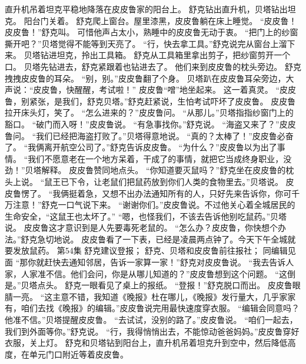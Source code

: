 \documentclass[a4paper,12pt,UTF8,twoside]{ctexbook}
\begin{document}
        直升机吊着坦克平稳地降落在皮皮鲁家的阳台上。 
        舒克钻出直升机，贝塔钻出坦克。 
        阳台门关着。 
        舒克爬上窗台。屋里漆黑，皮皮鲁躺在床上睡觉。 
        “皮皮鲁！皮皮鲁！”舒克叫。 
        可惜他声占太小，熟睡中的皮皮鲁无动于衷。 
        “把门上的纱窗撕开吧？”贝塔觉得不能等到天亮了。 
        “行，快去拿工具。”舒克说完从窗台上溜下来。 
        贝塔钻进坦克，拎出工具箱。 
        舒克从工具箱里拿出剪子，把纱窗剪开一个口。 
        贝塔先钻进去，舒克紧跟着也钻进去了。 
        他们来到皮皮鲁的枕头旁边。 
        舒克拽拽皮皮鲁的耳朵。 
        “别，别。”皮皮鲁翻了个身。 
        贝塔趴在皮皮鲁耳朵旁边，大声说：“皮皮鲁，快醒醒，考试啦！” 
        皮皮鲁“噌”地坐起来。 
        这一着真灵。 
        “皮皮鲁，别紧张，是我们，舒克贝塔。”舒克赶紧说，生怕考试吓坏了皮皮鲁。 
        皮皮鲁拉开床头灯，笑了。 
        “怎么进来的？”皮皮鲁问。 
        “从那儿。”贝塔指指纱窗门上的豁口。 
        “破门而入呀！”皮皮鲁说。 
        “有急事找你。”舒克说。 
        “海盗又来了？”皮皮鲁问。 
        “我们已经把海盗打败了。”贝塔得意地说。 
        “真的？太棒了！”皮皮鲁必奋了。 
        “我俩离开航空公司了。”舒克告诉皮皮鲁。 
        “为什么？”皮皮鲁以为出了事情。 
        “我们不愿意老在一个地方呆着，干成了的事情，就把它当成终身职业，没劲！”贝塔解释。 
        皮皮鲁赞同地点头。 
        “你知道要灭鼠吗？”舒克坐在皮皮鲁的枕头上说。 
        “鼠王已下令，让老鼠们把鼠药放到你们人类的食物里去。”贝塔说。 
        皮皮鲁愣了。 
        “我俩挺着急，又想不出办法通知所有的人，只好先来告诉你，你可千万注意！”舒克一口气说下来。 
        “谢谢你们。”皮皮鲁说。不过他关心着全城居民的生命安全，“这鼠王也太坏了。” 
        “嗯，也怪我们，不该去告诉他别吃鼠药。”贝塔说。 
        皮皮鲁这才意识到是人先要毒死老鼠的。 
        “怎么办？皮皮鲁，你快想个办法。”舒克急切地说。 
        皮皮鲁看了一下表，已经是凌晨两点钟了。今天下午全城就要发放鼠药。   第54集 
        舒克建议登报； 
        舒克、贝塔和皮皮鲁前往报社； 
        同编辑见面   
        “那你就赶快去通知邻居，告诉一家算一家！”舒克对皮皮鲁说。 
        “我去告诉人家，人家准不信。他们会问，你是从哪儿知道的？”皮皮鲁想到这个问题。 
        “这倒是。”贝塔点头。 
        舒克一眼看见了桌上的报纸。 
        “登报！”舒克脱口而出。 
        皮皮鲁眼腈一亮。 
        “这主意不错，我知道《晚报》杜在哪儿，《晚报》发行量大，几乎家家有，咱们去找《晚报》的编辑。”皮皮鲁说完用最快速度穿衣服。 
        “编辑会同意吗？他准不信。”贝塔提醒皮皮鲁。 
        “去试试，没别的路了。”皮皮鲁说。 
        “咱们一起去，我们到外面等你。”舒克说。 
        “行，我得悄悄出去，不能惊动爸爸妈妈。”皮皮鲁穿好衣服，关上灯。 
        舒克和贝塔钻到阳台上，直升机吊着坦克升到空中，然后降低高度，在单元门口附近等着皮皮鲁。 
\end{document}
